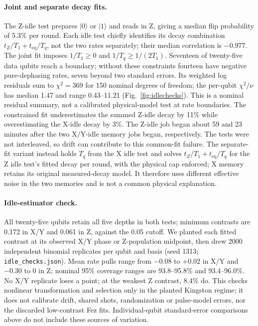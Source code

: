 \documentclass[aps,pra,reprint,nofootinbib,longbibliography,floatfix,showkeys]{revtex4-2}
\newcommand{\ket}[1]{\lvert #1\rangle}
\begin{document}
\paragraph*{Joint and separate decay fits.}
The Z-idle test prepares $\ket{0}$ or $\ket{1}$ and reads in Z, giving a median flip probability of 5.3\% per round.
Each idle test chiefly identifies its decay combination $t_Z/T_1+t_{\mathrm{eq}}/T_q$, not the two rates separately; their median correlation is $-0.977$.
The joint fit imposes $1/T_1\ge0$ and $1/T_q\ge1/(2T_1)$.
Seventeen of twenty-five data qubits reach a boundary; without these constraints fourteen have negative pure-dephasing rates, seven beyond two standard errors.
Its weighted log residuals sum to $\chi^2=369$ for 150 nominal degrees of freedom; the per-qubit $\chi^2/\nu$ has median 1.47 and range 0.43--11.21 (Fig.~\ref{fig:idlechecks}).
This is a nominal residual summary, not a calibrated physical-model test at rate boundaries.
The constrained fit underestimates the summed Z-idle decay by 11\% while overestimating the X-idle decay by 3\%.
The Z-idle job began about 59 and 23 minutes after the two X/Y-idle memory jobs began, respectively.
The tests were not interleaved, so drift can contribute to this common-fit failure.
The separate-fit variant instead holds $T_q$ from the X idle test and solves $t_Z/T_1+t_{\mathrm{eq}}/T_q$ for the Z idle test's fitted decay per round, with the physical cap enforced; X memory retains its original measured-decay model.
It therefore uses different effective noise in the two memories and is not a common physical explanation.

\paragraph*{Idle-estimator check.}
All twenty-five qubits retain all five depths in both tests; minimum contrasts are 0.172 in X/Y and 0.061 in Z, against the 0.05 cutoff.
We planted each fitted contrast at its observed X/Y phase or Z-population midpoint, then drew 2000 independent binomial replicates per qubit and basis (seed 1313; \texttt{idle\_checks.json}).
Mean rate pulls range from $-0.08$ to $+0.02$ in X/Y and $-0.30$ to 0 in Z; nominal 95\% coverage ranges are 93.8--95.8\% and 93.4--96.0\%.
No X/Y replicate loses a point; at the weakest Z contrast, 8.4\% do.
This checks nonlinear transformation and selection only in the planted Kingston regime; it does not calibrate drift, shared shots, randomization or pulse-model errors, nor the discarded low-contrast Fez fits.
Individual-qubit standard-error comparisons above do not include these sources of variation.
\end{document}
